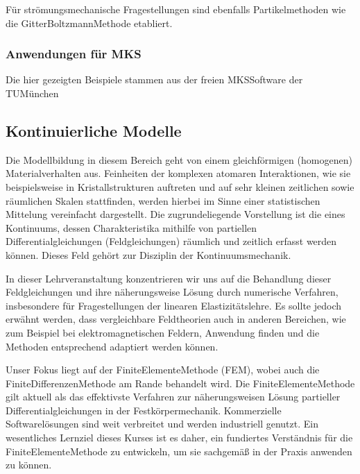 \documentclass[letterpaper,10pt,german]{jupyterBook}
\begin{document}
\sphinxAtStartPar
Für strömungsmechanische Fragestellungen sind ebenfalls Partikelmethoden wie die Gitter\sphinxhyphen{}Boltzmann\sphinxhyphen{}Methode etabliert.


\subsubsection{Anwendungen für MKS}
\label{\detokenize{chapters/chapter1/Einf_xfchrung_Modellklassifikation:anwendungen-fur-mks}}
\sphinxAtStartPar
Die hier gezeigten Beispiele stammen aus der freien MKS\sphinxhyphen{}Software der TU\sphinxhyphen{}München 



\sphinxAtStartPar
{}



\sphinxAtStartPar
{}


\subsection{Kontinuierliche Modelle}
\label{\detokenize{chapters/chapter1/Einf_xfchrung_Modellklassifikation:kontinuierliche-modelle}}
\sphinxAtStartPar
Die Modellbildung in diesem Bereich geht von einem gleichförmigen (homogenen) Materialverhalten aus. Feinheiten der komplexen atomaren Interaktionen, wie sie beispielsweise in Kristallstrukturen auftreten und auf sehr kleinen zeitlichen sowie räumlichen Skalen stattfinden, werden hierbei im Sinne einer statistischen Mittelung vereinfacht dargestellt. Die zugrundeliegende Vorstellung ist die eines Kontinuums, dessen Charakteristika mithilfe von partiellen Differentialgleichungen (Feldgleichungen) räumlich und zeitlich erfasst werden können. Dieses Feld gehört zur Disziplin der Kontinuumsmechanik.

\sphinxAtStartPar
In dieser Lehrveranstaltung konzentrieren wir uns auf die Behandlung dieser Feldgleichungen und ihre näherungsweise Lösung durch numerische Verfahren, insbesondere für Fragestellungen der linearen Elastizitätslehre. Es sollte jedoch erwähnt werden, dass vergleichbare Feldtheorien auch in anderen Bereichen, wie zum Beispiel bei elektromagnetischen Feldern, Anwendung finden und die Methoden entsprechend adaptiert werden können.

\sphinxAtStartPar
Unser Fokus liegt auf der Finite\sphinxhyphen{}Elemente\sphinxhyphen{}Methode (FEM), wobei auch die Finite\sphinxhyphen{}Differenzen\sphinxhyphen{}Methode am Rande behandelt wird. Die Finite\sphinxhyphen{}Elemente\sphinxhyphen{}Methode gilt aktuell als das effektivste Verfahren zur näherungsweisen Lösung partieller Differentialgleichungen in der Festkörpermechanik. Kommerzielle Softwarelösungen sind weit verbreitet und werden industriell genutzt. Ein wesentliches Lernziel dieses Kurses ist es daher, ein fundiertes Verständnis für die Finite\sphinxhyphen{}Elemente\sphinxhyphen{}Methode zu entwickeln, um sie sachgemäß in der Praxis anwenden zu können.
\end{document}
